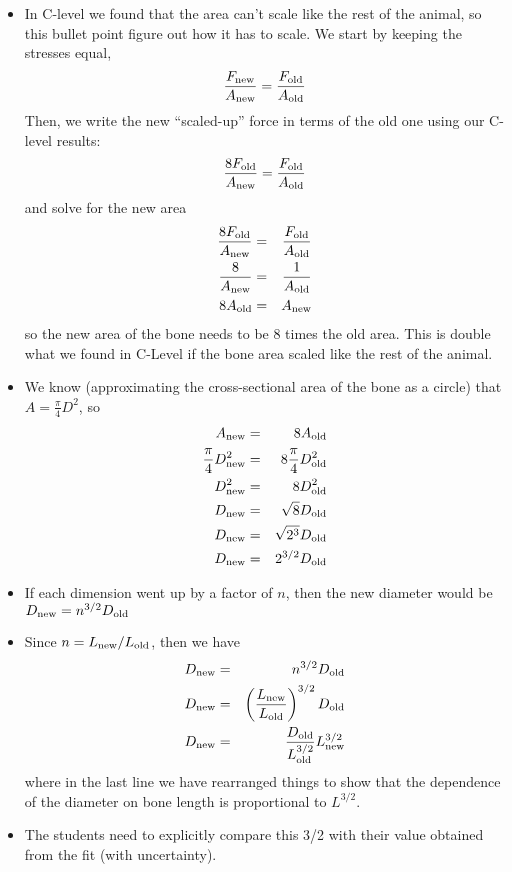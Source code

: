 \documentclass[fleqn,letterpaper]{article}
\begin{document}
\begin{itemize}
 \item{In C-level we found that the area can't scale like the rest of the animal, so this bullet point figure out how it has to scale.  We start by keeping the stresses equal,
 \begin{equation}
  \frac{F_{\rm new}}{A_{\rm new}} = \frac{F_{\rm old}}{A_{\rm old}}
 \end{equation}
 Then, we write the new ``scaled-up'' force in terms of the old one using our C-level results:
 \begin{equation}
  \frac{8 F_{\rm old}}{A_{\rm new}} = \frac{F_{\rm old}}{A_{\rm old}}
 \end{equation}
 and solve for the new area
  \begin{eqnarray}
   \frac{8 F_{\rm old}}{A_{\rm new}} & = & \frac{F_{\rm old}}{A_{\rm old}} \\
   \frac{8}{A_{\rm new}} & = & \frac{1}{A_{\rm old}} \\
   8 A_{\rm old} & = &  A_{\rm new}
  \end{eqnarray}
 so the new area of the bone needs to be 8 times the old area.  This is double what we found in C-Level if the bone area scaled like the rest of the animal.}
 \item{We know (approximating the cross-sectional area of the bone as a circle) that $A = \frac{\pi}{4}D^2$, so
  \begin{eqnarray}
   A_{\rm new} & = &  8 A_{\rm old} \\
   \frac{\pi}{4}D_{\rm new}^2 & = &  8 \frac{\pi}{4}D_{\rm old}^2 \\
   D_{\rm new}^2 & = &  8 D_{\rm old}^2 \\
   D_{\rm new} & = &  \sqrt{8} D_{\rm old} \\
   D_{\rm new} & = &  \sqrt{2^3} D_{\rm old} \\
   D_{\rm new} & = &  2^{3/2} D_{\rm old} \\
  \end{eqnarray}
}
\item{If each dimension went up by a factor of $n$, then the new diameter would be $D_{\rm new}  =  n^{3/2} D_{\rm old}$}
\item{Since $n = L_{\rm new}/L_{\rm old}$, then we have
  \begin{eqnarray}
   D_{\rm new} & = &  n^{3/2} D_{\rm old} \\
   D_{\rm new} & = &  \left( \frac{L_{\rm new}}{L_{\rm old}} \right)^{3/2} D_{\rm old} \\
   D_{\rm new} & = &   \frac{D_{\rm old}}{L_{\rm old}^{3/2}} L_{\rm new}^{3/2} \\
  \end{eqnarray}
  where in the last line we have rearranged things to show that the dependence of the diameter on bone length is proportional to $L^{3/2}$.
}
\item{The students need to explicitly compare this 3/2 with their value obtained from the fit (with uncertainty).}
\end{itemize}
\end{document}
